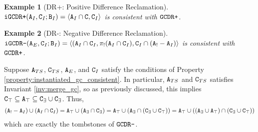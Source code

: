 \documentclass{article}
\numberwithin{equation}{section}
\newtheorem{example}{Example}[section]
\renewcommand{\tt}[1]{\ifmmode\text{\texttt{#1}}\else\texttt{#1}\fi}
\begin{document}
\begin{example}[DR+: Positive Difference Reclamation]
$\tt{iGCDR+}(\tt{A}_I, \tt{C}_I; \tt{B}_I) = \langle \tt{A}_I \cap \tt{C}, \tt{C}_I\rangle$ is consistent with $\tt{GCDR+}$.
\end{example}

\begin{example}[DR-: Negative Difference Reclamation]
$\tt{iGCDR-}(\tt{A}_E, \tt{C}_I; \tt{B}_I) = \langle (\tt{A}_I \cap \tt{C}_I, \pi_!(\tt{A}_I \cap \tt{C}_I), \tt{C}_I \cap (\tt{A}_! - \tt{A}_I)\rangle$ is consistent with $\tt{GCDR+}$.
\end{example}
Suppose $\tt{A}_{TS}$, $\tt{C}_{TS}$, $\tt{A}_E$, and $\tt{C}_I$ satisfy the conditions of Property \ref{property:instantiated_gc_consistent}.
In particular, $\tt{A}_{TS}$ and $\tt{C}_{TS}$ satisfies Invariant \ref{inv:merge_gc}, so as previously discussed, this implies $\tt{C}_\top \subseteq \tt{A}_\top \subseteq \tt{C}_\exists \cup \tt{C}_\exists$.
Thus,
\begin{align*}
(\tt{A}_! - \tt{A}_I) \cup (\tt{A}_I \cap \tt{C}_I)
= \tt{A}_\top \cup (\tt{A}_\exists \cap \tt{C}_\exists)
= \tt{A}_\top \cup (\tt{A}_\exists \cap (\tt{C}_\exists \cup \tt{C}_\top))
= \tt{A}_\top \cup ((\tt{A}_\exists \cup \tt{A}_\top) \cap (\tt{C}_\exists \cup \tt{C}_\top))
\end{align*}
which are exactly the tombstones of $\tt{GCDR-}$.
\end{document}
